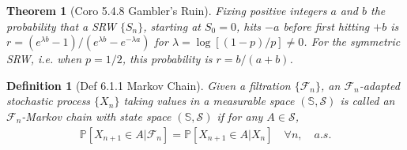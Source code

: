 \documentclass[11pt,a4paper]{article}
\numberwithin{equation}{section}%
\newtheorem{theorem}{Theorem}[]
\newtheorem{definition}{Definition}[]
\begin{document}
\begin{theorem}[Coro 5.4.8 Gambler's Ruin]
    Fixing positive integers $a$ and $b$ the probability that a SRW $\{S_n\}$, starting at $S_0 = 0$, hits $-a$ before first hitting $+b$ is $r = (e^{\lambda b} - 1)/(e^{\lambda b} - e^{-\lambda a})$ for $\lambda = \log[(1 - p)/p] \neq 0$. For the symmetric SRW, i.e. when $p = 1/2$, this probability is $r = b/(a + b)$.
\end{theorem}


\begin{definition}[Def 6.1.1 Markov Chain]
    Given a filtration $\{\mathcal{F}_n\}$, an $\mathcal{F}_n$-adapted stochastic process $\{X_n\}$ taking values in a measurable space $(\mathbb{S}, \mathcal{S})$ is called an $\mathcal{F}_n$-Markov chain with state space $(\mathbb{S}, \mathcal{S})$ if for any $A \in \mathcal{S}$,
    \begin{align*}
        \mathbb{P}[X_{n+1} \in A | \mathcal{F}_n] = \mathbb{P}[X_{n+1} \in A | X_n] \quad \forall n, \quad a.s.
    \end{align*}
\end{definition}
\end{document}
